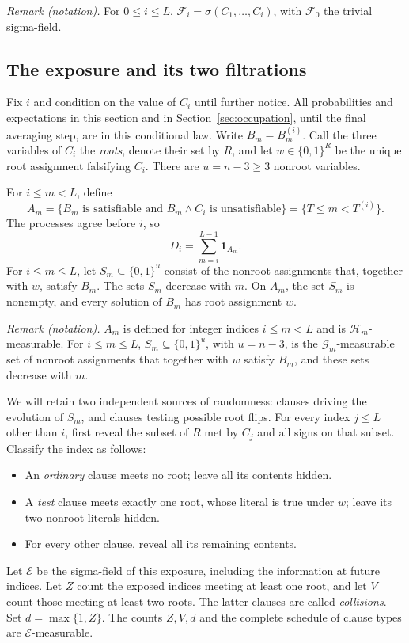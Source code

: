 \documentclass[11pt]{article}
\theoremstyle{remark}
\newcommand{\ind}{\mathbf 1}
\newcommand{\cE}{\mathcal E}
\newcommand{\cG}{\mathcal G}
\newcommand{\cH}{\mathcal H}
\numberwithin{equation}{section}
\begin{document}
\noindent\textit{Remark (notation).} For $0\le i\le L$, $\mathcal F_i=\sigma(C_1,\ldots,C_i)$, with $\mathcal F_0$ the trivial sigma-field.


\subsection{The exposure and its two filtrations}
\label{subsec:exposure}

Fix $i$ and condition on the value of $C_i$ until further notice.
All probabilities and expectations in this section and in
Section~\ref{sec:occupation}, until the final averaging step, are in this
conditional law. Write $B_m=B_m^{(i)}$.
Call the three variables of $C_i$ the \emph{roots}, denote their set
by $R$, and let $w\in\{0,1\}^R$ be the unique root assignment falsifying
$C_i$. There are $u=n-3\ge3$ nonroot variables.

For $i\le m<L$, define
\begin{equation}
 A_m=\{B_m\text{ is satisfiable and }B_m\wedge C_i
                      \text{ is unsatisfiable}\}
     =\{T\le m<T^{(i)}\}.
 \label{eq:A}
\end{equation}
The processes agree before $i$, so
\begin{equation}
 D_i=\sum_{m=i}^{L-1}\ind_{A_m}.
 \label{eq:delay}
\end{equation}
For $i\le m\le L$, let $S_m\subseteq\{0,1\}^u$ consist of the
nonroot assignments that, together with $w$, satisfy $B_m$.
The sets $S_m$ decrease with $m$. On $A_m$, the set $S_m$ is nonempty,
and every solution of $B_m$ has root assignment $w$.

\noindent\textit{Remark (notation).} $A_m$ is defined for integer indices $i\le m<L$ and is $\cH_m$-measurable. For $i\le m\le L$, $S_m\subseteq\{0,1\}^u$, with $u=n-3$, is the $\cG_m$-measurable set of nonroot assignments that together with $w$ satisfy $B_m$, and these sets decrease with $m$.


We will retain two independent sources of randomness: clauses driving
the evolution of $S_m$, and clauses testing possible root flips.
For every index $j\le L$ other than $i$, first reveal the subset of
$R$ met by $C_j$ and all signs on that subset. Classify the index as
follows:
\begin{itemize}
\item An \emph{ordinary} clause meets no root; leave all its contents hidden.
\item A \emph{test} clause meets exactly one root, whose literal is true
under $w$; leave its two nonroot literals hidden.
\item For every other clause, reveal all its remaining contents.
\end{itemize}
Let $\cE$ be the sigma-field of this exposure, including the information
at future indices. Let $Z$ count the exposed indices meeting at least
one root, and let $V$ count those meeting at least two roots. The latter
clauses are called \emph{collisions}. Set $d=\max\{1,Z\}$.
The counts $Z,V,d$ and the complete schedule of clause types are
$\cE$-measurable.
\end{document}
